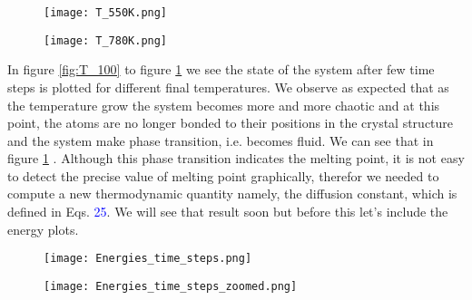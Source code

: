 \documentclass[a4paper]{article}
\begin{document}
\begin{figure}[!htbp] 
\centering
\begin{minipage}{.55\textwidth}
	\centering
	\texttt{[image: T\_550K.png]}
    \captionsetup{width=0.7\linewidth}
    \label{fig:T_550}
\end{minipage}%
\begin{minipage}{.55\textwidth}
	\centering
	\texttt{[image: T\_780K.png]}
    \captionsetup{width=0.7\linewidth}
    \label{fig:T_780}
\end{minipage}

\end{figure}

In figure \ref{fig:T_100} to figure \ref{fig:T_780} we see the state of the system after few time steps is plotted for different final temperatures. We observe as expected that as the temperature grow the system becomes more and more chaotic and at this point, the atoms are no longer bonded to their positions in the crystal structure and the system make phase transition, i.e. becomes fluid.  We can see that in figure \ref{fig:T_780} . Although this phase transition indicates the melting point, it is not easy to detect the precise value of melting point graphically, therefor we needed to compute a new thermodynamic quantity namely, the diffusion constant, which is defined in Eqs. \textcolor{blue}{25}. We will see that result soon but before this let's include the energy plots.  
\begin{figure}[!htbp] 
\centering
\begin{minipage}{.5\textwidth}
	\centering
	\texttt{[image: Energies\_time\_steps.png]}
\end{minipage}%
\begin{minipage}{.5\textwidth}
	\centering
	\texttt{[image: Energies\_time\_steps\_zoomed.png]}
\end{minipage}
\captionsetup{width=0.7\linewidth}

\label{fig:E_vs_T}
\end{figure}
\end{document}
